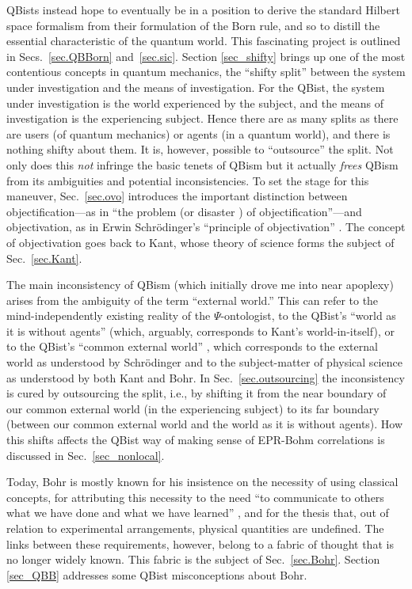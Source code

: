 \documentclass[12pt]{article}
\begin{document}
QBists instead hope to eventually be in a position to derive the standard Hilbert space formalism from their formulation of the Born rule, and so to distill the essential characteristic of the quantum world. This fascinating project is outlined in Secs.~\ref{sec.QBBorn} and~\ref{sec.sic}. Section \ref{sec_shifty} brings up one of the most contentious concepts in quantum mechanics, the ``shifty split''\cite{Bell90} between the system under investigation and the means of investigation. For the QBist, the system under investigation is the world experienced by the subject, and the means of investigation is the experiencing subject. Hence there are as many splits as there are users (of quantum mechanics) or agents (in a quantum world), and there is nothing shifty about them. It is, however, possible to ``outsource'' the split. Not only does this \emph{not} infringe the basic tenets of QBism but it actually \emph{frees} QBism from its ambiguities and potential inconsistencies. To set the stage for this maneuver, Sec.~\ref{sec.ovo} introduces the important distinction between objectification---as in ``the problem (or disaster \cite{vF1990}) of objectification''---and objectivation, as in Erwin Schr\"odinger's ``principle of objectivation'' \cite{SchrLifeMindMatter1}. The concept of objectivation goes back to Kant, whose theory of science forms the subject of Sec.~\ref{sec.Kant}.

The main inconsistency of QBism (which initially drove me into near apoplexy) arises from the ambiguity of the term ``external world.'' This can refer to the mind-independently existing reality of the $\Psi$-ontologist, to the QBist's ``world as it is without agents''\cite{FSinQSE} (which, arguably, corresponds to Kant's world-in-itself), or to the QBist's ``common external world'' \cite{FMS2014}, which corresponds to the external world as understood by Schr\"odinger and to the subject-matter of physical science as understood by both Kant and Bohr. In Sec.~\ref{sec.outsourcing} the inconsistency is cured by outsourcing the split, i.e., by shifting it from the near boundary of our common external world (in the experiencing subject) to its far boundary (between our common external world and the world as it is without agents). How this shifts affects the QBist way of making sense of EPR-Bohm correlations \cite{EPR,Bohm51} is discussed in Sec.~\ref{sec_nonlocal}.

Today, Bohr is mostly known for his insistence on the necessity of using classical concepts, for attributing this necessity to the need  ``to communicate to others what we have done and what we have learned'' \cite{Bohr-EAPHK,Bohr-APHK}, and for the thesis that, out of relation to experimental arrangements, physical quantities are undefined. The links between these requirements, however, belong to a fabric of thought that is no longer widely known. This fabric is the subject of Sec.~\ref{sec.Bohr}. Section \ref{sec_QBB} addresses some QBist misconceptions about Bohr.
\end{document}
